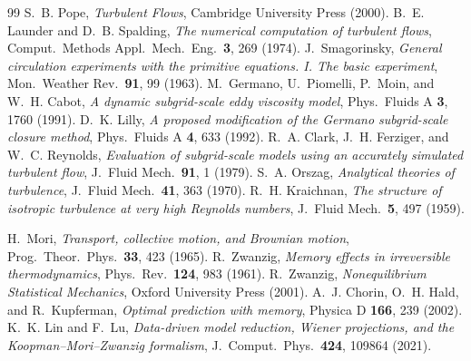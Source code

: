 \begin{thebibliography}{99}
S.~B. Pope,
\emph{Turbulent Flows},
Cambridge University Press (2000).
B.~E. Launder and D.~B. Spalding,
\emph{The numerical computation of turbulent flows},
Comput.\ Methods Appl.\ Mech.\ Eng.\ \textbf{3}, 269 (1974).
J.~Smagorinsky,
\emph{General circulation experiments with the primitive equations. I. The
basic experiment},
Mon.\ Weather Rev.\ \textbf{91}, 99 (1963).
M.~Germano, U.~Piomelli, P.~Moin, and W.~H. Cabot,
\emph{A dynamic subgrid-scale eddy viscosity model},
Phys.\ Fluids A \textbf{3}, 1760 (1991).
D.~K. Lilly,
\emph{A proposed modification of the Germano subgrid-scale closure method},
Phys.\ Fluids A \textbf{4}, 633 (1992).
R.~A. Clark, J.~H. Ferziger, and W.~C. Reynolds,
\emph{Evaluation of subgrid-scale models using an accurately simulated
turbulent flow},
J.\ Fluid Mech.\ \textbf{91}, 1 (1979).
S.~A. Orszag,
\emph{Analytical theories of turbulence},
J.\ Fluid Mech.\ \textbf{41}, 363 (1970).
R.~H. Kraichnan,
\emph{The structure of isotropic turbulence at very high Reynolds numbers},
J.\ Fluid Mech.\ \textbf{5}, 497 (1959).

H.~Mori,
\emph{Transport, collective motion, and Brownian motion},
Prog.\ Theor.\ Phys.\ \textbf{33}, 423 (1965).
R.~Zwanzig,
\emph{Memory effects in irreversible thermodynamics},
Phys.\ Rev.\ \textbf{124}, 983 (1961).
R.~Zwanzig,
\emph{Nonequilibrium Statistical Mechanics},
Oxford University Press (2001).
A.~J. Chorin, O.~H. Hald, and R.~Kupferman,
\emph{Optimal prediction with memory},
Physica D \textbf{166}, 239 (2002).
K.~K. Lin and F.~Lu,
\emph{Data-driven model reduction, Wiener projections, and the
Koopman--Mori--Zwanzig formalism},
J.\ Comput.\ Phys.\ \textbf{424}, 109864 (2021).


\end{thebibliography}
